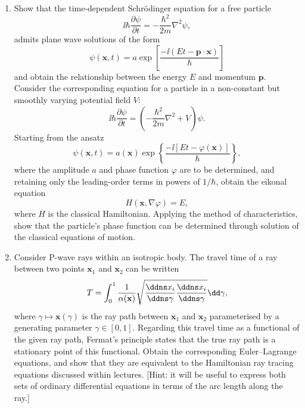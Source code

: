 \begin{enumerate}
\item Show that the time-dependent Schrödinger equation for a free particle
\begin{equation*}
    \ii\hbar\frac{\partial\psi}{\partial t}=-\frac{\hbar^{2}}{2m}\nabla^{2}\psi,
\end{equation*}
admits plane wave solutions of the form
\begin{equation*}
    \psi(\mathbf{x},t)=a\exp\left[\frac{-\ii(E t-\mathbf{p}\cdot\mathbf{x})}{\hbar}\right]
\end{equation*}
and obtain the relationship between the energy $E$ and momentum $\mathbf{p}$. Consider the corresponding equation for a particle in a non-constant but smoothly varying potential field $V$:
\begin{equation*}
    \ii\hbar\frac{\partial\psi}{\partial t}=\left(-\frac{\hbar^{2}}{2m}\nabla^{2}+V\right)\psi.
\end{equation*}
Starting from the ansatz
\begin{equation*}
    \psi(\mathbf{x},t)=a(\mathbf{x})\exp\left\{\frac{-\ii[E t-\varphi(\mathbf{x})]}{\hbar}\right\},
\end{equation*}
where the amplitude $a$ and phase function $\varphi$ are to be determined, and retaining only the leading-order terms in powers of $1/\hbar$, obtain the eikonal equation
\begin{equation*}
    H(\mathbf{x},\nabla\varphi)=E,
\end{equation*}
where $H$ is the classical Hamiltonian. Applying the method of characteristics, show that the particle's phase function can be determined through solution of the classical equations of motion.

\item Consider P-wave rays within an isotropic body. The travel time of a ray between two points $\mathbf{x}_{1}$ and $\mathbf{x}_{2}$ can be written
\begin{equation*}
    T = \int_{0}^{1} \frac{1}{\alpha(\mathbf{x})} \sqrt{\frac{\ddns x_{i}}{\ddns\gamma}\frac{\ddns x_{i}}{\ddns\gamma}} \dd \gamma,
\end{equation*}
where $\gamma\mapsto\mathbf{x}(\gamma)$ is the ray path between $\mathbf{x}_{1}$ and $\mathbf{x}_{2}$ parameterised by a generating parameter $\gamma\in[0,1]$. Regarding this travel time as a functional of the given ray path, Fermat's principle states that the true ray path is a stationary point of this functional. Obtain the corresponding Euler--Lagrange equations, and show that they are equivalent to the Hamiltonian ray tracing equations discussed within lectures. [Hint: it will be useful to express both sets of ordinary differential equations in terms of the arc length along the ray.]


\end{enumerate}
